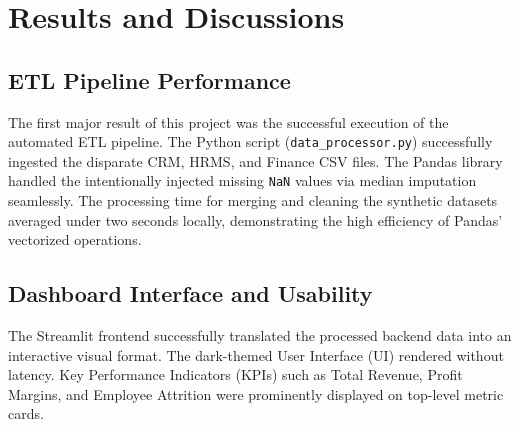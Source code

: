 \documentclass{book}
\begin{document}



\chapter{Results and Discussions}

\section{ETL Pipeline Performance}
The first major result of this project was the successful execution of the automated ETL pipeline. The Python script (\texttt{data\_processor.py}) successfully ingested the disparate CRM, HRMS, and Finance CSV files. The Pandas library handled the intentionally injected missing \texttt{NaN} values via median imputation seamlessly. The processing time for merging and cleaning the synthetic datasets averaged under two seconds locally, demonstrating the high efficiency of Pandas' vectorized operations.

\section{Dashboard Interface and Usability}
The Streamlit frontend successfully translated the processed backend data into an interactive visual format. The dark-themed User Interface (UI) rendered without latency. Key Performance Indicators (KPIs) such as Total Revenue, Profit Margins, and Employee Attrition were prominently displayed on top-level metric cards.
\end{document}

